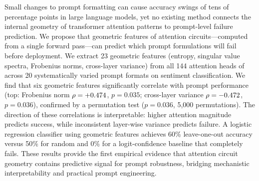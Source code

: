 Small changes to prompt formatting can cause accuracy swings of tens of percentage points in large language models, yet no existing method connects the internal geometry of transformer attention patterns to prompt-level failure prediction.
We propose that geometric features of attention circuits---computed from a single forward pass---can predict which prompt formulations will fail before deployment.
We extract 23 geometric features (entropy, singular value spectra, Frobenius norms, cross-layer variance) from all 144 attention heads of \gptsmall across 20 systematically varied prompt formats on \ssttwo sentiment classification.
We find that six geometric features significantly correlate with prompt performance (top: Frobenius norm $\rho = +0.474$, $p = 0.035$; cross-layer variance $\rho = -0.472$, $p = 0.036$), confirmed by a permutation test ($p = 0.036$, 5{,}000 permutations).
The direction of these correlations is interpretable: higher attention magnitude predicts success, while inconsistent layer-wise variance predicts failure.
A logistic regression classifier using geometric features achieves 60\% leave-one-out accuracy versus 50\% for random and 0\% for a logit-confidence baseline that completely fails.
These results provide the first empirical evidence that attention circuit geometry contains predictive signal for prompt robustness, bridging mechanistic interpretability and practical prompt engineering.
